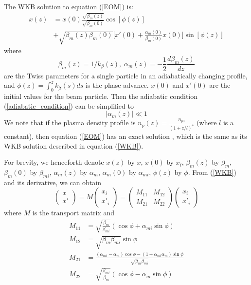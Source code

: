 \documentclass[%
reprint, superscriptaddress,
 amsmath,amssymb, aps,
prstab,
]{revtex4-2}
\begin{document}
The WKB solution to equation (\ref{EOM}) is: \begin{equation}
\begin{aligned} x(z)& = x(0)
\frac{\sqrt{\beta_{m}(z)}}{\sqrt{\beta_{m}(0)}}\cos[\phi(z)]\\
&+\sqrt{\beta_{m}(z)\beta_{m}(0)}\Big[ x'(0) +
\frac{\alpha_m(0)}{\beta_m(0)}x(0)\Big]\sin[\phi(z)] \end{aligned}
\label{WKB} \end{equation} where 
\begin{equation}
\beta_m(z) = 1/k_{\beta}(z),\; \alpha_m(z) =
-\frac{1}{2}\frac{d\beta_m(z)}{dz}
\label{matchedAlphaBeta}
\end{equation}
are the Twiss parameters for a single particle in an adiabatically changing profile, 
and $\phi(z) = \int_{0}^{z}
k_{\beta}(s) ds$ is the phase advance. $x(0)$ and $x'(0)$ are the initial values for
the beam particle. Then the adiabatic condition (\ref{adiabatic_condition}) can be simplified to \cite{Robert}
 \begin{equation}
 |\alpha_m(z)| \ll 1
 \label{adiabatic_condition_alpha}
 \end{equation}
We note that if the plasma density profile is $n_p(z)
= \frac{n_{p0}}{(1+z/l)^4}$ (where $l$ is a constant), then equation
(\ref{EOM}) has an exact solution \cite{German2014}, which is the same
as its WKB solution described in equation (\ref{WKB}).

For brevity, we henceforth denote $x(z)$ by $x$, $x(0)$ by $x_i$, 
$\beta_m(z)$ by $\beta_{m}$, $\beta_m(0)$ by $\beta_{mi}$, 
$\alpha_m(z)$ by $\alpha_{m}$, $\alpha_m(0)$ by $\alpha_{mi}$, $\phi(z)$ by $\phi$.
From (\ref{WKB}) and its derivative, we can obtain \[ \begin{pmatrix} x \\ x'
\end{pmatrix} = M \begin{pmatrix} x_i \\ x'_i \end{pmatrix} =
\begin{pmatrix} M_{11} & M_{12} \\ M_{21} & M_{22} \end{pmatrix}
\begin{pmatrix} x_i \\ x'_i \end{pmatrix} \] where $M$ is the
transport matrix and \[ \begin{aligned} M_{11} &=
\sqrt{\frac{\beta_m}{\beta_{mi}}}(\cos \phi + \alpha_{mi}\sin \phi)
\\ M_{12} &= \sqrt{\beta_m\beta_{mi}}\sin \phi \\ M_{21} &=
\frac{(\alpha_{mi}-\alpha_m)\cos \phi -
(1+\alpha_{mi}\alpha_m)\sin \phi}{\sqrt{\beta_m\beta_{mi}}} \\
M_{22} &= \sqrt{\frac{\beta_{mi}}{\beta_m}}(\cos \phi -
\alpha_m\sin \phi) \end{aligned} \]
\end{document}
